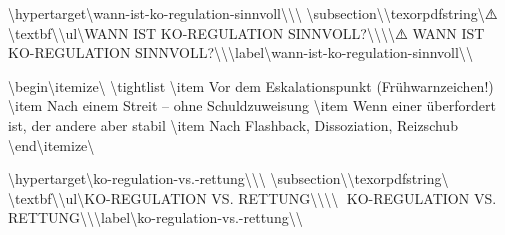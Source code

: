 \textbackslash{}hypertarget\textbackslash{}{wann-ist-ko-regulation-sinnvoll\textbackslash{}}\textbackslash{}{\textbackslash{}%
\textbackslash{}subsection\textbackslash{}{\textbackslash{}texorpdfstring\textbackslash{}{⚠️ \textbackslash{}textbf\textbackslash{}{\textbackslash{}ul\textbackslash{}{WANN IST KO-REGULATION SINNVOLL?\textbackslash{}}\textbackslash{}}\textbackslash{}}\textbackslash{}{⚠️ WANN IST KO-REGULATION SINNVOLL?\textbackslash{}}\textbackslash{}}\textbackslash{}label\textbackslash{}{wann-ist-ko-regulation-sinnvoll\textbackslash{}}\textbackslash{}}

\textbackslash{}begin\textbackslash{}{itemize\textbackslash{}}
\textbackslash{}tightlist
\textbackslash{}item
  Vor dem Eskalationspunkt (Frühwarnzeichen!)
\textbackslash{}item
  Nach einem Streit -- ohne Schuldzuweisung
\textbackslash{}item
  Wenn einer überfordert ist, der andere aber stabil
\textbackslash{}item
  Nach Flashback, Dissoziation, Reizschub
\textbackslash{}end\textbackslash{}{itemize\textbackslash{}}

\textbackslash{}hypertarget\textbackslash{}{ko-regulation-vs.-rettung\textbackslash{}}\textbackslash{}{\textbackslash{}%
\textbackslash{}subsection\textbackslash{}{\textbackslash{}texorpdfstring\textbackslash{}{🔁 \textbackslash{}textbf\textbackslash{}{\textbackslash{}ul\textbackslash{}{KO-REGULATION VS. RETTUNG\textbackslash{}}\textbackslash{}}\textbackslash{}}\textbackslash{}{🔁 KO-REGULATION VS. RETTUNG\textbackslash{}}\textbackslash{}}\textbackslash{}label\textbackslash{}{ko-regulation-vs.-rettung\textbackslash{}}\textbackslash{}}

